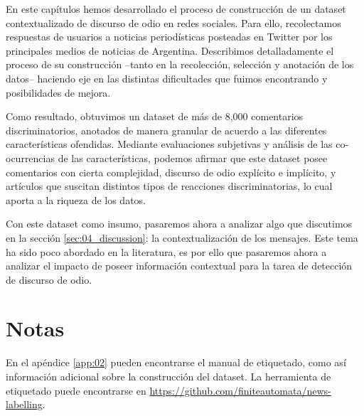 En este capítulos hemos desarrollado el proceso de construcción de un dataset contextualizado de discurso de odio en redes sociales. Para ello, recolectamos respuestas de usuarios a noticias periodísticas posteadas en Twitter por los principales medios de noticias de Argentina. Describimos detalladamente el proceso de su construcción --tanto en la recolección, selección y anotación de los datos-- haciendo eje en las distintas dificultades que fuimos encontrando y posibilidades de mejora.

Como resultado, obtuvimos un dataset de más de 8,000 comentarios discriminatorios, anotados de manera granular de acuerdo a las diferentes características ofendidas. Mediante evaluaciones subjetivas y análisis de las co-ocurrencias de las características, podemos afirmar que este dataset posee comentarios con cierta complejidad, discurso de odio explícito e implícito, y artículos que suscitan distintos tipos de reacciones discriminatorias, lo cual aporta a la riqueza de los datos.

Con este dataset como insumo, pasaremos ahora a analizar algo que discutimos en la sección \ref{sec:04_discussion}: la contextualización de los mensajes. Este tema ha sido poco abordado en la literatura, es por ello que pasaremos ahora a analizar el impacto de poseer información contextual para la tarea de detección de discurso de odio.

\section{Notas}


En el apéndice \ref{app:02} pueden encontrarse el manual de etiquetado, como así información adicional sobre la construcción del dataset. La herramienta de etiquetado puede encontrarse en \url{https://github.com/finiteautomata/news-labelling}.
